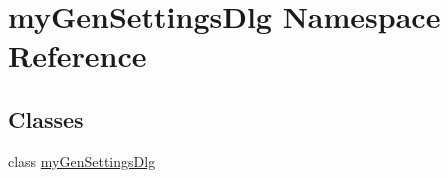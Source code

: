 \hypertarget{namespacemy_gen_settings_dlg}{\section{my\-Gen\-Settings\-Dlg Namespace Reference}
\label{namespacemy_gen_settings_dlg}
}
\subsection*{Classes}
\begin{DoxyCompactItemize}
\item 
class \hyperlink{classmy_gen_settings_dlg_1_1my_gen_settings_dlg}{my\-Gen\-Settings\-Dlg}
\end{DoxyCompactItemize}
